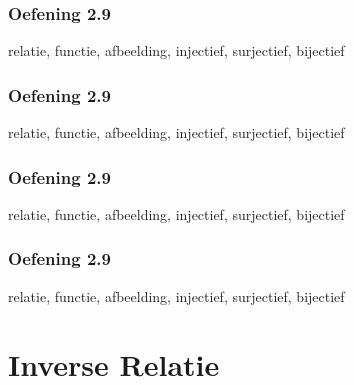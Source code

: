 \documentclass[dutch]{../khlslides}
\newcommand{\axes}{
  \path[use as bounding box] (-.5,-.5) rectangle (4,4);
  \draw[step=3cm,gray,thin] (-.5,-.5) grid (4,4);
  \draw[thin,->] (-.5,0) -- (4,0) node[at end,above left] {$A$};
  \draw[thin,->] (0,-.5) -- (0,4) node[at end,left] {$B$};
}
\begin{document}
\begin{frame}
  \frametitle{Oefening 2.9}
  \begin{center}
    relatie, functie, afbeelding, injectief, surjectief, bijectief
    \vskip1cm
  \end{center}
\end{frame}

\begin{frame}
  \frametitle{Oefening 2.9}
  \begin{center}
    relatie, functie, afbeelding, injectief, surjectief, bijectief
    \vskip1cm
  \end{center}
\end{frame}

\begin{frame}
  \frametitle{Oefening 2.9}
  \begin{center}
    relatie, functie, afbeelding, injectief, surjectief, bijectief
    \vskip1cm
  \end{center}
\end{frame}

\begin{frame}
  \frametitle{Oefening 2.9}
  \begin{center}
    relatie, functie, afbeelding, injectief, surjectief, bijectief
    \vskip1cm
  \end{center}
\end{frame}


\section{Inverse Relatie}

\frame{ \tableofcontents[currentsection] }
\end{document}
